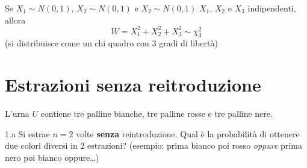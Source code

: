 \documentclass[
  11pt,
]{book}
\theoremstyle{mytheoremstyle}
\theoremstyle{mydefstyle}
\newenvironment{sol}
  {
  \begin{tcolorbox}[enhanced,breakable,arc=0.1mm,boxrule=1pt,colback=white,colframe=iblue,
  title=\bf \fontfamily{lmss}\selectfont \hspace{.5 cm} Soluzione,drop fuzzy shadow]

}{
\end{tcolorbox}
  }
\begin{document}
\begin{sol}
Se \(X_1\sim N(0,1)\), \(X_2\sim N(0,1)\) e \(X_2\sim N(0,1)\)
\(X_1\), \(X_2\) e \(X_3\) indipendenti, allora\\
\[W=X_1^2+X_2^2+X_3^2\sim \chi_3^2\]
(si distribuisce come un chi quadro con 3 gradi di libertà)

\end{sol}

\section{Estrazioni senza reitroduzione}\label{estrazioni-senza-reitroduzione}

L'urna \(U\) contiene tre palline bianche, tre palline rosse e tre palline nere.

1.a Si estrae \(n=2\) volte \textbf{senza} reintroduzione. Qual è la probabilità di ottenere due colori diversi in 2 estrazioni? (esempio: prima bianco poi rosso \emph{oppure} prima nero poi bianco oppure\ldots)
\end{document}
